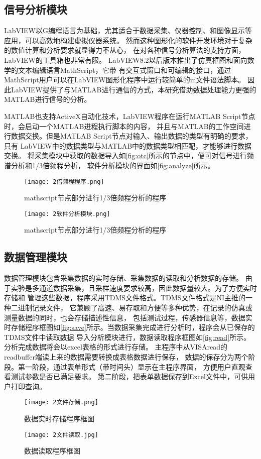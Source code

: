 \subsection{信号分析模块}
LabVIEW以G编程语言为基础，尤其适合于数据采集、仪器控制、和图像显示等应用，可以高效地构建虚拟仪器系统。
然而这种图形化的软件开发环境对于复杂的数值计算和分析要求就显得力不从心，
在对各种信号分析算法的支持方面，LabVIEW的工具箱也非常有限。
LabVIEW8.2以后版本推出了仿真框图和面向数学的文本编辑语言MathScript，它带
有交互式窗口和可编辑的接口，通过MathScript用户可以在LabVIEW图形化程序中运行较简单的m文件语法脚本。
因此LabVIEW提供了与MATLAB进行通信的方式，本研究借助数据处理能力更强的MATLAB进行信号的分析。

MATLAB也支持ActiveX自动化技术，LabVIEW程序在运行MATLAB Script节点时，会启动一个MATLAB进程执行脚本的内容，
并且与MATLAB的工作空间进行数据交换。但是MATLAB Script节点对输入、输出数据的类型有明确的要求，只有
LabVIEW中的数据类型与MATLAB中的数据类型相匹配，才能够进行数据交换。
将采集模块中获取的数据导入如\autoref{fig:otc}所示的节点中，便可对信号进行频谱分析和1/3倍频程分析，
软件分析模块的界面如\autoref{fig:analyze}所示。
\begin{figure}[htbp]
    \centering
    \texttt{[image: 2倍频程程序.png]}
    \caption{\label{fig:otc}mathscript节点部分进行1/3倍频程分析的程序}
\end{figure}

\begin{figure}[htbp]
    \centering
    \texttt{[image: 2软件分析模块.png]}
    \caption{\label{fig:analyze}mathscript节点部分进行1/3倍频程分析的程序}
\end{figure}

\subsection{数据管理模块}
数据管理模块包含采集数据的实时存储、采集数据的读取和分析数据的存储。
由于实验是多通道数据采集，且采样速度要求较高，因此数据量较大。为了方便实时存储和
管理这些数据，程序采用TDMS文件格式。TDMS文件格式是NI主推的一种二进制记录文件，
它兼顾了高速、易存取和方便等多种优势，在记录的仿真或测量数据的同时，也会存储描述性信息，
包括测试过程，传感器信息等，数据实时存储程序框图如\autoref{fig:save}所示。当数据采集完成进行分析时，程序会从已保存的TDMS文件中读取数据
导入分析模块进行，数据读取程序框图如\autoref{fig:read}所示。分析完成数据将会以excel表格的形式进行存储。
主程序中从VISAread的readbuffer端读上来的数据需要转换成表格数据进行保存，
数据的保存分为两个阶段。第一阶段，通过表单形式（带时间头）显示在主程序界面，
方便用户直观查看测试参数是否已满足要求。
第二阶段，把表单数据保存到Excel文件中，可供用户打印查询。
\begin{figure}[htbp]
    \centering
    \texttt{[image: 2文件存储.png]}
    \caption{\label{fig:save}数据实时存储程序框图}
\end{figure}
\begin{figure}[htbp]
    \centering
    \texttt{[image: 2文件读取.jpg]}
    \caption{\label{fig:read}数据读取程序框图}
\end{figure}
